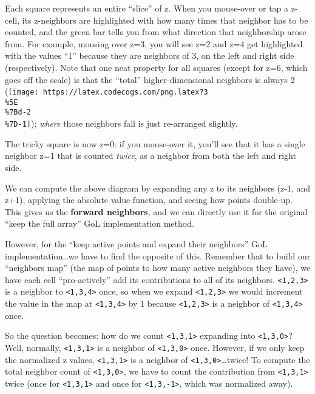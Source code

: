 \documentclass[]{article}
\begin{document}
Each square represents an entire ``slice'' of z. When you mouse-over or tap a
z-cell, its z-neighbors are highlighted with how many times that neighbor has to
be counted, and the green bar tells you from what direction that neighborship
arose from. For example, mousing over z=3, you will see z=2 and z=4 get
highlighted with the values ``1'' because they are neighbors of 3, on the left
and right side (respectively). Note that one neat property for all squares
(except for z=6, which goes off the scale) is that the ``total''
higher-dimensional neighbors is always 2
(\texttt{[image: https://latex.codecogs.com/png.latex?3\\\%5E\\\%7Bd-2\\\%7D-1]});
\emph{where} those neighbors fall is just re-arranged slightly.

The tricky square is now z=0: if you mouse-over it, you'll see that it has a
single neighbor z=1 that is counted \emph{twice}, as a neighbor from both the
left and right side.

We can compute the above diagram by expanding any z to its neighbors (z-1, and
z+1), applying the absolute value function, and seeing how points double-up.
This gives us the \textbf{forward neighbors}, and we can directly use it for the
original ``keep the full array'' GoL implementation method.

However, for the ``keep active points and expand their neighbors'' GoL
implementation\ldots we have to find the opposite of this. Remember that to
build our ``neighbors map'' (the map of points to how many active neighbors they
have), we have each cell ``pro-actively'' add its contributions to all of its
neighbors. \texttt{\textless{}1,2,3\textgreater{}} is a neighbor to
\texttt{\textless{}1,3,4\textgreater{}} once, so when we expand
\texttt{\textless{}1,2,3\textgreater{}} we would increment the value in the map
at \texttt{\textless{}1,3,4\textgreater{}} by 1 because
\texttt{\textless{}1,2,3\textgreater{}} is a neighbor of
\texttt{\textless{}1,3,4\textgreater{}} once.

So the question becomes: how do we count \texttt{\textless{}1,3,1\textgreater{}}
expanding into \texttt{\textless{}1,3,0\textgreater{}}? Well, normally,
\texttt{\textless{}1,3,1\textgreater{}} is a neighbor of
\texttt{\textless{}1,3,0\textgreater{}} once. However, if we only keep the
normalized z values, \texttt{\textless{}1,3,1\textgreater{}} is a neighbor of
\texttt{\textless{}1,3,0\textgreater{}}\ldots twice! To compute the total
neighbor count of \texttt{\textless{}1,3,0\textgreater{}}, we have to count the
contribution from \texttt{\textless{}1,3,1\textgreater{}} twice (once for
\texttt{\textless{}1,3,1\textgreater{}} and once for
\texttt{\textless{}1,3,-1\textgreater{}}, which was normalized away).
\end{document}

